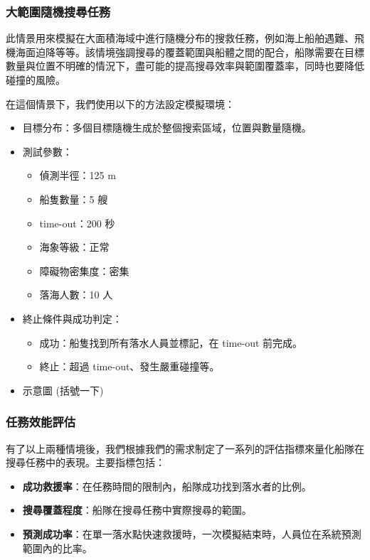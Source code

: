 \documentclass[12pt,a4paper]{article}
\begin{document}
\subsubsection{大範圍隨機搜尋任務}
此情景用來模擬在大面積海域中進行隨機分布的搜救任務，例如海上船舶遇難、飛機海面迫降等等。該情境強調搜尋的覆蓋範圍與船體之間的配合，船隊需要在目標數量與位置不明確的情況下，盡可能的提高搜尋效率與範圍覆蓋率，同時也要降低碰撞的風險。
\\ \par
在這個情景下，我們使用以下的方法設定模擬環境：
\begin{itemize}
    \item 目標分布：多個目標隨機生成於整個搜索區域，位置與數量隨機。
    \item 測試參數：
    \begin{itemize}
        \item 偵測半徑：125 m
        \item 船隻數量：5 艘
        \item time-out：200 秒
        \item 海象等級：正常
        \item 障礙物密集度：密集
        \item 落海人數：10 人
    \end{itemize}
    \item 終止條件與成功判定：
    \begin{itemize}
        \item 成功：船隻找到所有落水人員並標記，在 time-out 前完成。
        \item 終止：超過 time-out、發生嚴重碰撞等。
    \end{itemize}
    \item 示意圖 (括號一下)
\end{itemize}

\subsubsection{任務效能評估}
有了以上兩種情境後，我們根據我們的需求制定了一系列的評估指標來量化船隊在搜尋任務中的表現。主要指標包括：
\begin{itemize}
    \item \textbf{成功救援率}：在任務時間的限制內，船隊成功找到落水者的比例。
    \item \textbf{搜尋覆蓋程度}：船隊在搜尋任務中實際搜尋的範圍。
    \item \textbf{預測成功率}：在單一落水點快速救援時，一次模擬結束時，人員位在系統預測範圍內的比率。
\end{itemize}
\end{document}
